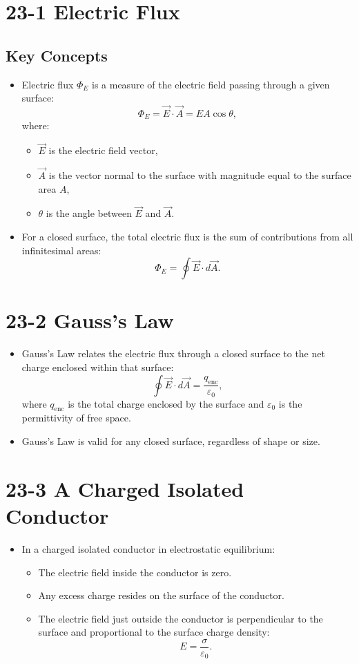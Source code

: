 \documentclass{article}
\begin{document}
\section*{23-1 Electric Flux}

\subsection*{Key Concepts}
\begin{itemize}
    \item Electric flux $\Phi_E$ is a measure of the electric field passing through a given surface:
    \[
    \Phi_E = \vec{E} \cdot \vec{A} = EA\cos\theta,
    \]
    where:
    \begin{itemize}
        \item $\vec{E}$ is the electric field vector,
        \item $\vec{A}$ is the vector normal to the surface with magnitude equal to the surface area $A$,
        \item $\theta$ is the angle between $\vec{E}$ and $\vec{A}$.
    \end{itemize}
    \item For a closed surface, the total electric flux is the sum of contributions from all infinitesimal areas:
    \[
    \Phi_E = \oint \vec{E} \cdot d\vec{A}.
    \]
\end{itemize}

\section*{23-2 Gauss's Law}
\begin{itemize}
    \item Gauss's Law relates the electric flux through a closed surface to the net charge enclosed within that surface:
    \[
    \oint \vec{E} \cdot d\vec{A} = \frac{q_\text{enc}}{\varepsilon_0},
    \]
    where $q_\text{enc}$ is the total charge enclosed by the surface and $\varepsilon_0$ is the permittivity of free space.
    \item Gauss's Law is valid for any closed surface, regardless of shape or size.
\end{itemize}

\section*{23-3 A Charged Isolated Conductor}
\begin{itemize}
    \item In a charged isolated conductor in electrostatic equilibrium:
    \begin{itemize}
        \item The electric field inside the conductor is zero.
        \item Any excess charge resides on the surface of the conductor.
        \item The electric field just outside the conductor is perpendicular to the surface and proportional to the surface charge density:
        \[
        E = \frac{\sigma}{\varepsilon_0}.
        \]
    \end{itemize}
\end{itemize}
\end{document}

